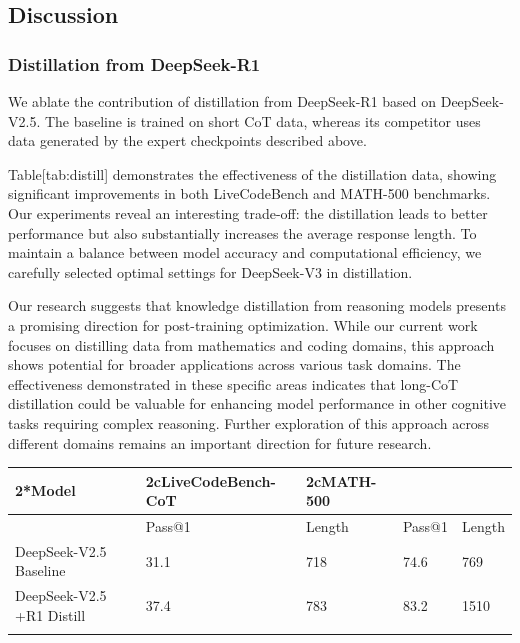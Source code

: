 \documentclass[11pt,a4paper]{article}
\begin{document}
\subsection{Discussion}

\subsubsection{Distillation from DeepSeek-R1}

We ablate the contribution of distillation from DeepSeek-R1 based on DeepSeek-V2.5. 
The baseline is trained on short CoT data, whereas its competitor uses data generated by the expert checkpoints described above.

Table[tab:distill] demonstrates the effectiveness of the distillation data, showing significant improvements in both LiveCodeBench and MATH-500 benchmarks. 
Our experiments reveal an interesting trade-off: the distillation leads to better performance but also substantially increases the average response length. 
To maintain a balance between model accuracy and computational efficiency, we carefully selected optimal settings for DeepSeek-V3 in distillation.

Our research suggests that knowledge distillation from reasoning models presents a promising direction for post-training optimization. 
While our current work focuses on distilling data from mathematics and coding domains, this approach shows potential for broader applications across various task domains. 
The effectiveness demonstrated in these specific areas indicates that long-CoT distillation could be valuable for enhancing model performance in other cognitive tasks requiring complex reasoning. 
Further exploration of this approach across different domains remains an important direction for future research.

\begin{table}[h]
\begin{tabular}{|l|l|l|l|l|}
\hline
2*Model & 2cLiveCodeBench-CoT & 2cMATH-500 &  &  \\ \hline
 & Pass@1 & Length & Pass@1 & Length \\ \hline
DeepSeek-V2.5 Baseline & 31.1 & 718 & 74.6 & 769 \\ \hline
DeepSeek-V2.5 +R1 Distill & 37.4 & 783 & 83.2 & 1510 \\ \hline
 &  &  &  &  \\ \hline
\end{tabular}
\end{table}
\end{document}
